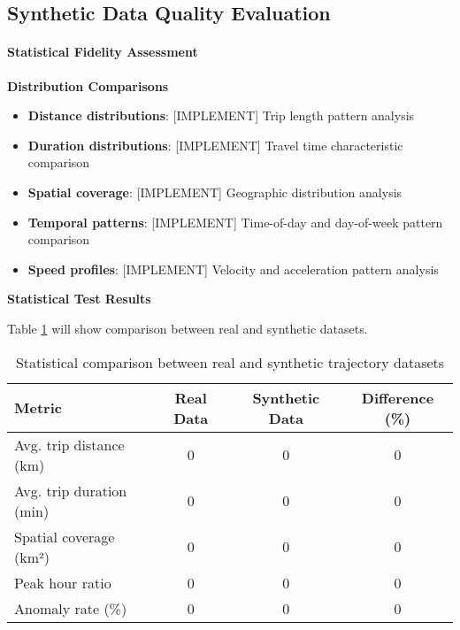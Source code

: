\documentclass[runningheads]{llncs}
\begin{document}
\subsection{Synthetic Data Quality Evaluation}
\label{sec:synthetic-eval}


\paragraph{Statistical Fidelity Assessment}

\textbf{Distribution Comparisons}
\begin{itemize}
\item \textbf{Distance distributions}: [IMPLEMENT] Trip length pattern analysis
\item \textbf{Duration distributions}: [IMPLEMENT] Travel time characteristic comparison
\item \textbf{Spatial coverage}: [IMPLEMENT] Geographic distribution analysis
\item \textbf{Temporal patterns}: [IMPLEMENT] Time-of-day and day-of-week pattern comparison
\item \textbf{Speed profiles}: [IMPLEMENT] Velocity and acceleration pattern analysis
\end{itemize}

\textbf{Statistical Test Results}

Table \ref{tab:synthetic-stats} will show comparison between real and synthetic datasets.

\begin{table}[h]
\centering
\begin{tabular}{l|c|c|c}
\textbf{Metric} & \textbf{Real Data} & \textbf{Synthetic Data} & \textbf{Difference (\%)} \\ \hline
Avg. trip distance (km) & 0 & 0 & 0 \\
Avg. trip duration (min) & 0 & 0 & 0 \\
Spatial coverage (km²) & 0 & 0 & 0 \\
Peak hour ratio & 0 & 0 & 0 \\
Anomaly rate (\%) & 0 & 0 & 0 \\
\end{tabular}
\caption{Statistical comparison between real and synthetic trajectory datasets}
\label{tab:synthetic-stats}
\end{table}
\end{document}

